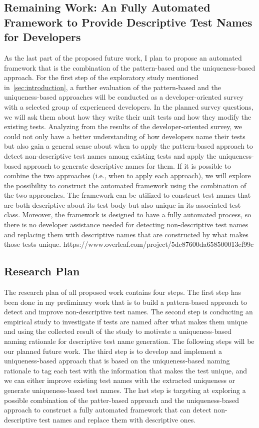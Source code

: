 \subsection{Remaining Work: An Fully Automated Framework to Provide Descriptive Test Names for Developers}
\label{sec:remaining-work2}

As the last part of the proposed future work, I plan to propose an automated framework that is the combination of the pattern-based and the uniqueness-based approach.
%
For the first step of the exploratory study mentioned in~\cref{sec:introduction}, a further evaluation of the pattern-based and the uniqueness-based approaches will be conducted as a developer-oriented survey with a selected group of experienced developers.
%
In the planned survey questions, we will ask them about how they write their unit tests and how they modify the existing tests.
%
Analyzing from the results of the developer-oriented survey, we could not only have a better understanding of how developers name their tests but also gain a general sense about when to apply the pattern-based approach to detect non-descriptive test names among existing tests and apply the uniqueness-based approach to generate descriptive names for them.
%
If it is possible to combine the two approaches (i.e., when to apply each approach), we will explore the possibility to construct the automated framework using the combination of the two approaches.
%
The framework can be utilized to construct test names that are both descriptive about its test body but also unique in its associated test class.
%
Moreover, the framework is designed to have a fully automated process, so there is no developer assistance needed for detecting non-descriptive test names and replacing them with descriptive names that are constructed by what makes those tests unique.
https://www.overleaf.com/project/5dc87600da658500013ef99c
\subsection{Research Plan}

The research plan of all proposed work contains four steps.
%
The first step has been done in my preliminary work that is to build a pattern-based approach to detect and improve non-descriptive test names.
%
The second step is conducting an empirical study to investigate if tests are named after what makes them unique and using the collected result of the study to motivate a uniqueness-based naming rationale for descriptive test name generation.
%
The following steps will be our planned future work.
%
The third step is to develop and implement a uniqueness-based approach that is based on the uniqueness-based naming rationale to tag each test with the information that makes the test unique, and we can either improve existing test names with the extracted uniqueness or generate uniqueness-based test names.
%
The last step is targeting at exploring a possible combination of the patter-based approach and the uniqueness-based approach to construct a fully automated framework that can detect non-descriptive test names and replace them with descriptive ones.